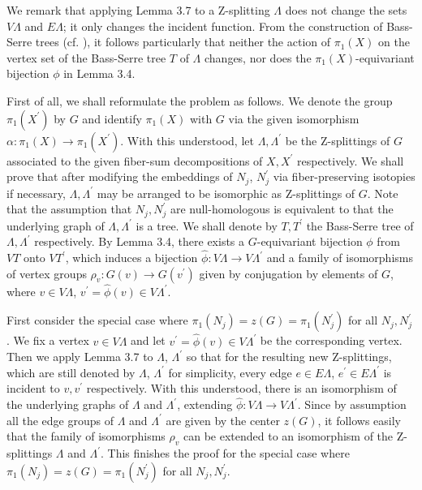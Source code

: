 \documentclass[11pt]{amsart}
\theoremstyle{plain}
\numberwithin{theorem}{section}
\theoremstyle{definition}
\begin{document}
We remark that applying Lemma 3.7 to a Z-splitting $\Lambda$ does not change the sets 
$V\Lambda$ and $E\Lambda$; it only changes the incident function. From the construction of 
Bass-Serre trees (cf. \cite{DD}), it follows particularly that neither the action of $\pi_1(X)$ on the vertex set of the Bass-Serre tree $T$ of $\Lambda$ changes, nor does the 
$\pi_1(X)$-equivariant bijection $\phi$ in Lemma 3.4. 

\vspace{3mm}


\vspace{3mm}

First of all, we shall reformulate the problem as follows. We denote the group $\pi_1(X^\prime)$
by $G$ and identify $\pi_1(X)$ with $G$ via the given isomorphism $\alpha: \pi_1(X)
\rightarrow \pi_1(X^\prime)$. With this understood, let $\Lambda,\Lambda^\prime$ be the 
Z-splittings of $G$ associated to the given fiber-sum
decompositions of $X,X^\prime$ respectively. We shall prove that after modifying the 
embeddings of $N_j$, $N_j^\prime$ via fiber-preserving isotopies if necessary, 
$\Lambda,\Lambda^\prime$ may be arranged to be isomorphic as Z-splittings of $G$.
Note that the assumption that $N_j,N_j^\prime$ are null-homologous is equivalent to that 
the underlying graph of $\Lambda,\Lambda^\prime$ is a tree. We shall denote by 
$T,T^\prime$ the Bass-Serre tree of $\Lambda,\Lambda^\prime$ respectively. By Lemma 3.4, 
there exists a $G$-equivariant bijection $\phi$ from $VT$ onto $VT^\prime$, which induces a bijection $\hat{\phi}:V\Lambda\rightarrow V\Lambda^\prime$ and a family of isomorphisms 
of vertex groups $\rho_v: G(v) \rightarrow G({v^\prime})$ given by conjugation 
by elements of $G$, where $v\in V\Lambda$, $v^\prime=\hat{\phi}(v)\in V\Lambda^\prime$.

First consider the special case where $\pi_1(N_j)=z(G)=\pi_1(N_j^\prime)$ for all $N_j,N_j^\prime$. 
We fix a vertex $v\in V\Lambda$ and let $v^\prime=\hat{\phi}(v)\in V\Lambda^\prime$ be the 
corresponding vertex. Then we 
apply Lemma 3.7 to $\Lambda$, $\Lambda^\prime$ so that for the resulting new Z-splittings, 
which are still denoted by $\Lambda$, $\Lambda^\prime$ for simplicity, every 
edge $e\in E\Lambda$, $e^\prime\in E\Lambda^\prime$ is incident to $v,v^\prime$ respectively. 
With this understood, there is
an isomorphism of the underlying graphs of $\Lambda$ and $\Lambda^\prime$, extending 
$\hat{\phi}:V\Lambda\rightarrow V\Lambda^\prime$. Since by assumption all the edge groups of 
$\Lambda$ and $\Lambda^\prime$ are given by the center $z(G)$, it follows easily that the family of
isomorphisms $\rho_v$ can be extended to an isomorphism of the Z-splittings  
$\Lambda$ and $\Lambda^\prime$. This finishes the proof for the special case
where $\pi_1(N_j)=z(G)=\pi_1(N_j^\prime)$ for all $N_j,N_j^\prime$.
\end{document}
